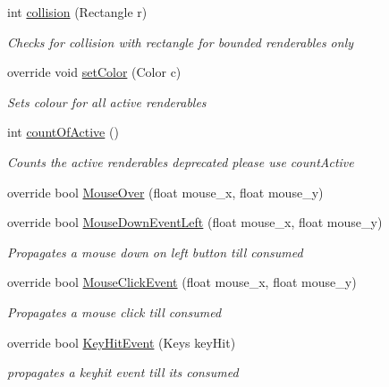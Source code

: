 \begin{DoxyCompactItemize}
int \mbox{\hyperlink{class_r_c___framework_1_1_r_c___renderable_list_aa38871296e0b22f5c1c80ba82605f0ba}{collision}} (Rectangle r)
\begin{DoxyCompactList}\small\item\em Checks for collision with rectangle for bounded renderables only \end{DoxyCompactList}\item 
override void \mbox{\hyperlink{class_r_c___framework_1_1_r_c___renderable_list_a8cba0458aba6bbf1b4d7b57217060f43}{set\+Color}} (Color c)
\begin{DoxyCompactList}\small\item\em Sets colour for all active renderables \end{DoxyCompactList}\item 
int \mbox{\hyperlink{class_r_c___framework_1_1_r_c___renderable_list_a343637f6337ee79256fcba579e2a69be}{count\+Of\+Active}} ()
\begin{DoxyCompactList}\small\item\em Counts the active renderables deprecated please use count\+Active \end{DoxyCompactList}\item 
override bool \mbox{\hyperlink{class_r_c___framework_1_1_r_c___renderable_list_a5867cf3044d40adda1bb7c2be3211a99}{Mouse\+Over}} (float mouse\+\_\+x, float mouse\+\_\+y)
\item 
override bool \mbox{\hyperlink{class_r_c___framework_1_1_r_c___renderable_list_adce00726f7093db725ed6195292156a7}{Mouse\+Down\+Event\+Left}} (float mouse\+\_\+x, float mouse\+\_\+y)
\begin{DoxyCompactList}\small\item\em Propagates a mouse down on left button till consumed \end{DoxyCompactList}\item 
override bool \mbox{\hyperlink{class_r_c___framework_1_1_r_c___renderable_list_ac275d3df45899b62e1378e01a100268d}{Mouse\+Click\+Event}} (float mouse\+\_\+x, float mouse\+\_\+y)
\begin{DoxyCompactList}\small\item\em Propagates a mouse click till consumed \end{DoxyCompactList}\item 
override bool \mbox{\hyperlink{class_r_c___framework_1_1_r_c___renderable_list_a221a0bf056ff4f8e02d22e3b8b66de81}{Key\+Hit\+Event}} (Keys key\+Hit)
\begin{DoxyCompactList}\small\item\em propagates a keyhit event till its consumed \end{DoxyCompactList}\item 

\end{DoxyCompactItemize}
